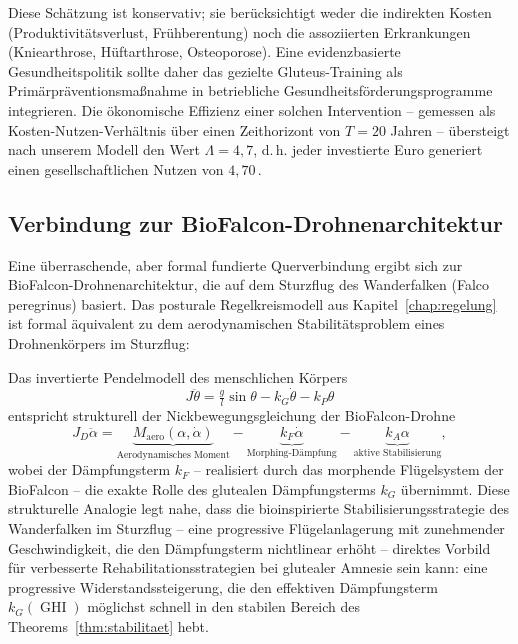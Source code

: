 ﻿\documentclass[12pt,a4paper]{report}
\theoremstyle{plain}
\theoremstyle{definition}
\theoremstyle{remark}
\DeclareMathOperator{\GHI}{GHI}
\newcommand{\euro}{\texteuro}    %
\begin{document}
	Diese Schätzung ist konservativ; sie berücksichtigt weder die indirekten
	Kosten (Produktivitätsverlust, Frühberentung) noch die assoziierten
	Erkrankungen (Kniearthrose, Hüftarthrose, Osteoporose). Eine evidenzbasierte
	Gesundheitspolitik sollte daher das gezielte Gluteus-Training als
	Primärpräventionsmaßnahme in betriebliche Gesundheitsförderungs\-programme
	integrieren. Die ökonomische Effizienz einer solchen Intervention --
	gemessen als Kosten-Nutzen-Verhältnis über einen Zeithorizont von
	$T = 20$ Jahren -- übersteigt nach unserem Modell den Wert $\Lambda = 4{,}7$,
	d.\,h. jeder investierte Euro generiert einen gesellschaftlichen Nutzen
	von $4{,}70$\,\euro{}.
	
	\subsection{Verbindung zur BioFalcon-Drohnenarchitektur}
	\label{subsec:biofalcon}
	
	Eine überraschende, aber formal fundierte Querverbindung ergibt sich
	zur BioFalcon-Drohnenarchitektur, die auf dem Sturzflug des Wanderfalken
	(Falco peregrinus) basiert. Das posturale Regelkreismodell aus
	Kapitel~\ref{chap:regelung} ist formal äquivalent zu dem
	aerodynamischen Stabilitätsproblem eines Drohnenkörpers im Sturzflug:
	
	Das invertierte Pendelmodell des menschlichen Körpers
	\[
	J\ddot\theta = \tfrac{g}{l}\sin\theta - k_G\dot\theta - k_P\theta
	\]
	entspricht strukturell der Nickbewegungsgleichung der BioFalcon-Drohne
	\[
	J_D\ddot\alpha = \underbrace{M_{\mathrm{aero}}(\alpha, \dot\alpha)}_{\text{Aerodynamisches Moment}}
	- \underbrace{k_F\dot\alpha}_{\text{Morphing-Dämpfung}} - \underbrace{k_A\alpha}_{\text{aktive Stabilisierung}},
	\]
	wobei der Dämpfungsterm $k_F$ -- realisiert durch das morphende Flügelsystem
	der BioFalcon -- die exakte Rolle des glutealen Dämpfungsterms $k_G$
	übernimmt. Diese strukturelle Analogie legt nahe, dass die bioinspirierte
	Stabilisierungsstrategie des Wanderfalken im Sturzflug -- eine progressive
	Flügelanlagerung mit zunehmender Geschwindigkeit, die den Dämpfungsterm
	nichtlinear erhöht -- direktes Vorbild für verbesserte Rehabilitationsstrategien
	bei glutealer Amnesie sein kann: eine progressive Widerstandssteigerung,
	die den effektiven Dämpfungsterm $k_G(\GHI)$ möglichst schnell in den
	stabilen Bereich des Theorems~\ref{thm:stabilitaet} hebt.
	
\end{document}
